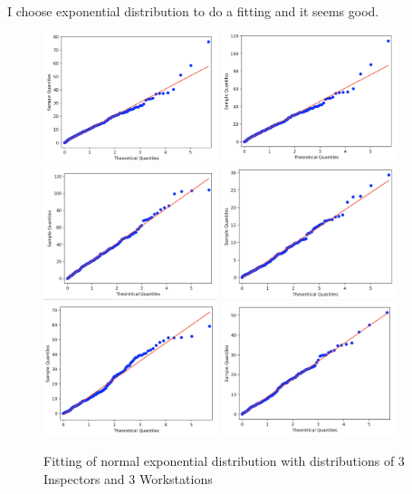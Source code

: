 \documentclass{article}
\begin{document}
I choose exponential distribution to do a fitting and it seems good.

\begin{figure}[htbp]
\begin{center}
\includegraphics[width=2in]{hist1.png}
\includegraphics[width=2in]{hist2.png}
\includegraphics[width=2in]{hist3.png}
\includegraphics[width=2in]{hist4.png}
\includegraphics[width=2in]{hist5.png}
\includegraphics[width=2in]{hist6.png}
\caption{Fitting of normal exponential distribution with distributions of 3 Inspectors and 3 Workstations}
\label{data2}
\end{center}
\end{figure}
\end{document}
